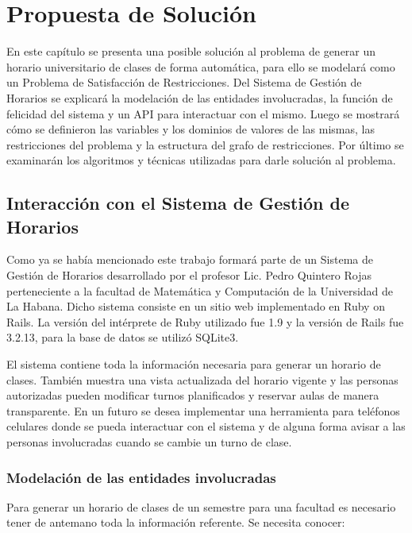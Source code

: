 \chapter{Propuesta de Solución}

En este cap\'itulo se presenta una posible soluci\'on al problema de generar un horario universitario de clases de forma autom\'atica, para ello se modelar\'a como un Problema de Satisfacci\'on de Restricciones. Del Sistema de Gesti\'on de Horarios se explicar\'a la modelaci\'on de las entidades involucradas, la funci\'on de felicidad del sistema y un API para interactuar con el mismo. Luego se mostrar\'a c\'omo se definieron las variables y los dominios de valores de las mismas, las restricciones del problema y la estructura del grafo de restricciones. Por \'ultimo se examinar\'an los algoritmos y t\'ecnicas utilizadas para darle soluci\'on al problema.

\section{Interacci\'on con el Sistema de Gesti\'on de Horarios}

Como ya se hab\'ia mencionado este trabajo formar\'a parte de un Sistema de Gesti\'on de Horarios desarrollado por el profesor Lic. Pedro Quintero Rojas perteneciente a la facultad de Matem\'atica y Computaci\'on de la Universidad de La Habana. Dicho sistema consiste en un sitio web implementado en Ruby on Rails. La versi\'on del int\'erprete de Ruby utilizado fue 1.9 y la versi\'on de Rails fue 3.2.13, para la base de datos se utiliz\'o SQLite3.

El sistema contiene toda la informaci\'on necesaria para generar un horario de clases. Tambi\'en muestra una vista actualizada del horario vigente y las personas autorizadas pueden modificar turnos planificados y reservar aulas de manera transparente. En un futuro se desea implementar una herramienta para tel\'efonos celulares donde se pueda interactuar con el sistema y de alguna forma avisar a las personas involucradas cuando se cambie un turno de clase. 

\subsection{Modelaci\'on de las entidades involucradas}

Para generar un horario de clases de un semestre para una facultad es necesario tener de antemano toda la informaci\'on referente. Se necesita conocer:

